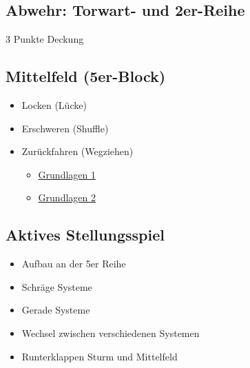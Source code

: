 \subsection{Abwehr: Torwart- und 2er-Reihe}
\label{taktik:defensive:halten}

3 Punkte Deckung


\subsection{Mittelfeld (5er-Block)}
\label{taktik:defensive:5erblock}

\begin{itemize}
    \item Locken (Lücke)
    \item Erschweren (Shuffle)
    \item Zurückfahren (Wegziehen)
\begin{itemize}
    \item \href{http://ungeblogtkickern.blogspot.de/2015/05/5er-defensive.html}{Grundlagen 1}
    \item \href{http://ungeblogtkickern.blogspot.de/2015/06/defensivbewegungen-auf-der-5er-reihe.html}{Grundlagen 2}
\end{itemize}  
\end{itemize}  

\subsection{Aktives Stellungsspiel}
\label{taktik:defensive:aktivesstellungsspiel}

\begin{itemize}
    \item Aufbau an der 5er Reihe
    \item Schräge Systeme
    \item Gerade Systeme
    \item Wechsel zwischen verschiedenen Systemen
    \item Runterklappen Sturm und Mittelfeld
\end{itemize}
